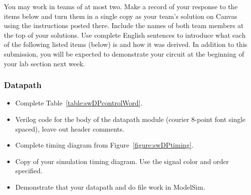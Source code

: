 You may work in teams of at most two. Make a record of your response to
the items below and turn them in a single copy as your team's solution
on Canvas using the instructions posted there. Include the names of both
team members at the top of your solutions. Use complete English
sentences to introduce what each of the following listed items (below)
is and how it was derived. In addition to this submission, you will be
expected to demonstrate your circuit at the beginning of your lab
section next week.

\subsubsection{Datapath}

\begin{itemize}
\item
  Complete Table~\ref{table:swDPcontrolWord}.
\item
  Verilog code for the body of the datapath module (courier 8-point font
  single spaced), leave out header comments.
\item
 Complete timing diagram from Figure~\ref{figure:swDPtiming}.
\item
  Copy of your simulation timing diagram. Use the signal
  color and order specified.
\item
  Demonstrate that your datapath and do file work in ModelSim.
\end{itemize}

